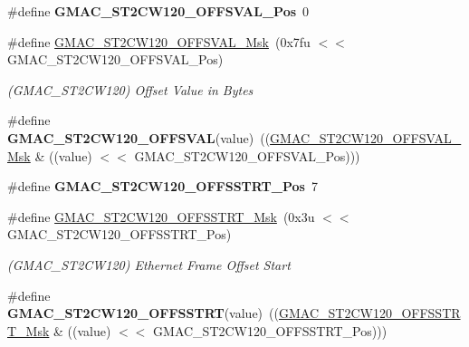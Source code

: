 \begin{DoxyCompactItemize}
\item 
\mbox{\label{group__SAME70__GMAC_gac8188f27d6f98bf4cd3856cf26c38532}} 
\#define {\bfseries G\+M\+A\+C\+\_\+\+S\+T2\+C\+W120\+\_\+\+O\+F\+F\+S\+V\+A\+L\+\_\+\+Pos}~0
\item 
\mbox{\label{group__SAME70__GMAC_ga9f78922480be91a1b5c14693baa792c9}} 
\#define \mbox{\hyperlink{group__SAME70__GMAC_ga9f78922480be91a1b5c14693baa792c9}{G\+M\+A\+C\+\_\+\+S\+T2\+C\+W120\+\_\+\+O\+F\+F\+S\+V\+A\+L\+\_\+\+Msk}}~(0x7fu $<$$<$ G\+M\+A\+C\+\_\+\+S\+T2\+C\+W120\+\_\+\+O\+F\+F\+S\+V\+A\+L\+\_\+\+Pos)
\begin{DoxyCompactList}\small\item\em (G\+M\+A\+C\+\_\+\+S\+T2\+C\+W120) Offset Value in Bytes \end{DoxyCompactList}\item 
\mbox{\label{group__SAME70__GMAC_ga7798195c153a0b6757218e66adcfe778}} 
\#define {\bfseries G\+M\+A\+C\+\_\+\+S\+T2\+C\+W120\+\_\+\+O\+F\+F\+S\+V\+AL}(value)~((\mbox{\hyperlink{group__SAMV71__GMAC_ga9f78922480be91a1b5c14693baa792c9}{G\+M\+A\+C\+\_\+\+S\+T2\+C\+W120\+\_\+\+O\+F\+F\+S\+V\+A\+L\+\_\+\+Msk}} \& ((value) $<$$<$ G\+M\+A\+C\+\_\+\+S\+T2\+C\+W120\+\_\+\+O\+F\+F\+S\+V\+A\+L\+\_\+\+Pos)))
\item 
\mbox{\label{group__SAME70__GMAC_ga08faf662a0b169bc8ce575f01b291f53}} 
\#define {\bfseries G\+M\+A\+C\+\_\+\+S\+T2\+C\+W120\+\_\+\+O\+F\+F\+S\+S\+T\+R\+T\+\_\+\+Pos}~7
\item 
\mbox{\label{group__SAME70__GMAC_ga6e8493c4d9acaf8f5c3e81822b2cbfaa}} 
\#define \mbox{\hyperlink{group__SAME70__GMAC_ga6e8493c4d9acaf8f5c3e81822b2cbfaa}{G\+M\+A\+C\+\_\+\+S\+T2\+C\+W120\+\_\+\+O\+F\+F\+S\+S\+T\+R\+T\+\_\+\+Msk}}~(0x3u $<$$<$ G\+M\+A\+C\+\_\+\+S\+T2\+C\+W120\+\_\+\+O\+F\+F\+S\+S\+T\+R\+T\+\_\+\+Pos)
\begin{DoxyCompactList}\small\item\em (G\+M\+A\+C\+\_\+\+S\+T2\+C\+W120) Ethernet Frame Offset Start \end{DoxyCompactList}\item 
\mbox{\label{group__SAME70__GMAC_ga70a788160001c300643ab515ad7d098e}} 
\#define {\bfseries G\+M\+A\+C\+\_\+\+S\+T2\+C\+W120\+\_\+\+O\+F\+F\+S\+S\+T\+RT}(value)~((\mbox{\hyperlink{group__SAMV71__GMAC_ga6e8493c4d9acaf8f5c3e81822b2cbfaa}{G\+M\+A\+C\+\_\+\+S\+T2\+C\+W120\+\_\+\+O\+F\+F\+S\+S\+T\+R\+T\+\_\+\+Msk}} \& ((value) $<$$<$ G\+M\+A\+C\+\_\+\+S\+T2\+C\+W120\+\_\+\+O\+F\+F\+S\+S\+T\+R\+T\+\_\+\+Pos)))

\end{DoxyCompactItemize}
